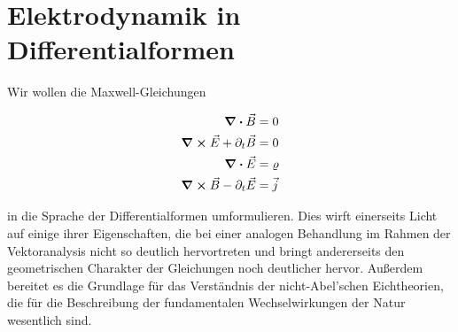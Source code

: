 \section{Elektrodynamik in Differentialformen}
Wir wollen die Maxwell-Gleichungen

\begin{align}
\div{\vec{B}} &= 0 \\
\curl \vec{E} + \partial_t \vec{B} &= 0 \\
\div{\vec{E}} &= \varrho \\
\curl \vec{B} - \partial_t \vec{E} &= \vec{j}
\end{align} 

in die Sprache der Differentialformen umformulieren. Dies wirft einerseits Licht auf einige ihrer Eigenschaften, die bei einer analogen Behandlung im Rahmen der Vektoranalysis nicht so deutlich hervortreten und bringt andererseits den geometrischen Charakter der Gleichungen noch deutlicher hervor. Außerdem bereitet es die Grundlage für das Verständnis der nicht-Abel'schen Eichtheorien, die für die Beschreibung der fundamentalen Wechselwirkungen der Natur wesentlich sind.
